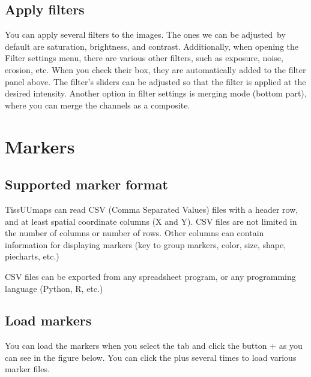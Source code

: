 \documentclass[letterpaper,10pt,english,openany,oneside]{sphinxmanual}
\begin{document}
\subsection{Apply filters}
\label{\detokenize{docs/starting/images:apply-filters}}
\sphinxAtStartPar
You can apply several filters to the images. The ones we can be adjusted by default are saturation, brightness, and contrast. Additionally, when opening the Filter settings menu, there are various other filters, such as exposure, noise, erosion, etc. When you check their box, they are automatically added to the filter panel above. The filter’s sliders can be adjusted so that the filter is applied at the desired intensity. Another option in filter settings is merging mode (bottom part), where you can merge the channels as a composite.

\sphinxAtStartPar
{}

\sphinxstepscope


\section{Markers}
\label{\detokenize{docs/starting/markers:markers}}\label{\detokenize{docs/starting/markers::doc}}

\subsection{Supported marker format}
\label{\detokenize{docs/starting/markers:supported-marker-format}}
\sphinxAtStartPar
TissUUmaps can read CSV (Comma Separated Values) files with a header row, and at least spatial coordinate columns (X and Y). CSV files are not limited in the number of columns or number of rows. Other columns can contain information for displaying markers (key to group markers, color, size, shape, piecharts, etc.)

\sphinxAtStartPar
CSV files can be exported from any spreadsheet program, or any programming language (Python, R, etc.)


\subsection{Load markers}
\label{\detokenize{docs/starting/markers:load-markers}}
\sphinxAtStartPar
You can load the markers when you select the  tab and click the button + as you can see in the figure below. You can click the plus several times to load various marker files.
\end{document}
